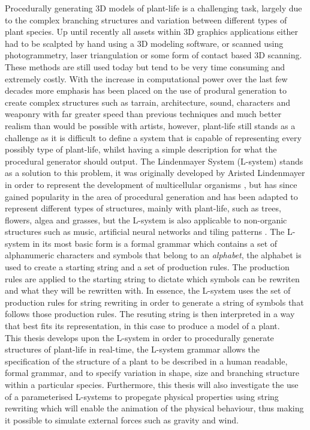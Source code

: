 
\lettrine[lines=3]{P}{}rocedurally generating 3D models of plant-life is a challenging task, largely due to the complex branching structures and variation between different types of plant species. Up until recently all assets within 3D graphics applications either had to be scalpted by hand using a 3D modeling software, or scanned using photogrammetry, laser triangulation or some form of contact based 3D scanning. These methods are still used today but tend to be very time consuming and extremely costly. With the increase in computational power over the last few decades more emphasis has been placed on the use of produral generation to create complex structures such as tarrain, architecture, sound, characters and weaponry with far greater speed than previous techniques and much better realism than would be possible with artists, however, plant-life still stands as a challenge as it is difficult to define a system that is capable of representing every possibly type of plant-life, whilst having a simple description for what the procedural generator should output. The Lindenmayer System (L-system) stands as a solution to this problem, it was originally developed by Aristed Lindenmayer in order to represent the development of multicellular organisms \cite{lindenmayer1968mathematical}, but has since gained popularity in the area of procedural generation and has been adapted to represent different types of structures, mainly with plant-life, such as trees, flowers, algea and grasses, but the L-system is also applicable to non-organic structures such as music, artificial neural networks and tiling patterns \cite{Prusinkiewicz1989}. The L-system in its most basic form is a formal grammar which contains a set of alphanumeric characters and symbols that belong to an \textit{alphabet}, the alphabet is used to create a starting string and a set of production rules. The production rules are applied to the starting string to dictate which symbols can be rewriten and what they will be rewritten with. In essence, the L-system uses the set of production rules for string rewriting in order to generate a string of symbols that follows those production rules. The resuting string is then interpreted in a way that best fits its representation, in this case to produce a model of a plant. \\
This thesis develops upon the L-system in order to procedurally generate structures of plant-life in real-time, the L-system grammar allows the specification of the structure of a plant to be described in a human readable, formal grammar, and to specify variation in shape, size and branching structure within a particular species. Furthermore, this thesis will also investigate the use of a parameterised L-systems to propegate physical properties using string rewriting which will enable the animation of the physical behaviour, thus making it possible to simulate external forces such as gravity and wind.




